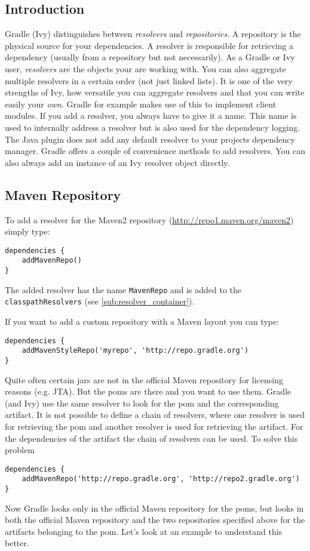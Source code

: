 \subsection{Introduction} %
\label{sub:introduction}
Gradle (Ivy) distinguishes between \emph{resolvers} and \emph{repositories}. A repository is the physical source for your dependencies. A resolver is responsible for retrieving a dependency (usually from a repository but not necessarily). As a Gradle or Ivy user, \emph{resolvers} are the objects your are working with. You can also aggregate multiple resolvers in a certain order (not just linked lists). It is one of the very strengths of Ivy, how versatile you can aggregate resolvers and that you can write easily your \emph{own}. Gradle for example makes use of this to implement client modules.
If you add a resolver, you always have to give it a name. This name is used to internally address a resolver but is also used for the dependency logging.
The Java plugin does not add any default resolver to your projects dependency manager. Gradle offers a couple of convenience methods to add resolvers. You can also always add an instance of an Ivy resolver object directly.

\subsection{Maven Repository} %
\label{sub:maven_repo}
To add a resolver for the Maven2 repository (\url{http://repo1.maven.org/maven2}) simply type:
\begin{Verbatim}
dependencies {
	addMavenRepo()
}
\end{Verbatim}
The added resolver has the name \texttt{MavenRepo} and is added to the \texttt{classpathResolvers} (see \ref{sub:resolver_container}). 

If you want to add a custom repository with a Maven layout you can type:
\begin{Verbatim}
dependencies {
	addMavenStyleRepo('myrepo', 'http://repo.gradle.org')
}
\end{Verbatim}
Quite often certain jars are not in the official Maven repository for licensing reasons (e.g. JTA). But the poms are there and you want to use them. Gradle (and Ivy) use the same resolver to look for the pom and the corresponding artifact. It is not possible to define a chain of resolvers, where one resolver is used for retrieving the pom and another resolver is used for retrieving the artifact. For the dependencies of the artifact the chain of resolvers can be used. To solve this problem
\begin{Verbatim}
dependencies {
	addMavenRepo('http://repo.gradle.org', 'http://repo2.gradle.org')
}
\end{Verbatim}
Now Gradle looks only in the official Maven repository for the poms, but looks in both the official Maven repository and the two repositories specified above for the artifacts belonging to the pom. Let's look at an example to understand this better.

